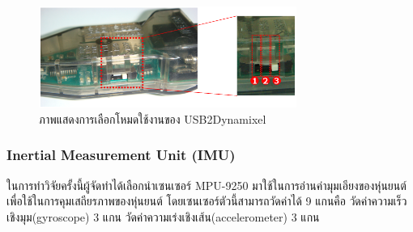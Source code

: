 \begin{figure}[ht]
    \centering
    \includegraphics[width=0.75\textwidth]{chapter3/images/useusb2dynamixel.png}
    \caption{ภาพแสดงการเลือกโหมดใช้งานของ USB2Dynamixel}
    \label{fig:useusb2dynamixel}
\end{figure}

\clearpage
\subsubsection*{Inertial Measurement Unit (IMU)}
ในการทำวิจัยครั้งนี้ผู้จัดทำได้เลือกนำเซนเซอร์ MPU-9250 มาใช้ในการอ่านค่ามุมเอียงของหุ่นยนต์เพื่อใช้ในการคุมเสถียรภาพของหุ่นยนต์
โดยเซนเซอร์ตัวนี้สามารถวัดค่าได้ 9 แกนคือ วัดค่าความเร็วเชิงมุม(gyroscope) 3 แกน วัดค่าความเร่งเชิงเส้น(accelerometer) 3 แกน
